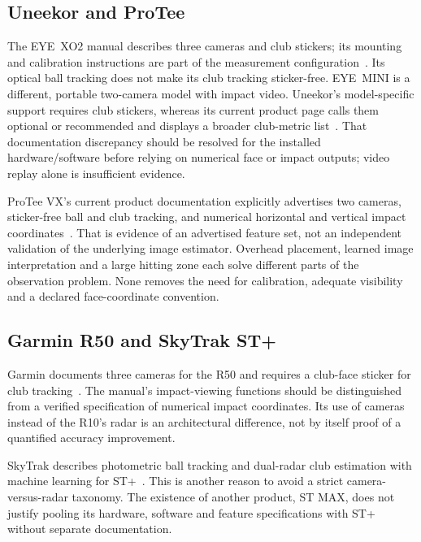 \subsection{Uneekor and ProTee}

The EYE~XO2 manual describes three cameras and club stickers; its mounting and calibration instructions are part of the measurement configuration~\cite{uneekorxo2manual}.
Its optical ball tracking does not make its club tracking sticker-free.
EYE~MINI is a different, portable two-camera model with impact video.
Uneekor's model-specific support requires club stickers, whereas its current product page calls them optional or recommended and displays a broader club-metric list~\cite{uneekorminisupport,uneekoreyexo}.
That documentation discrepancy should be resolved for the installed hardware/software before relying on numerical face or impact outputs; video replay alone is insufficient evidence.

ProTee VX's current product documentation explicitly advertises two cameras, sticker-free ball and club tracking, and numerical horizontal and vertical impact coordinates~\cite{proteevx}.
That is evidence of an advertised feature set, not an independent validation of the underlying image estimator.
Overhead placement, learned image interpretation and a large hitting zone each solve different parts of the observation problem.
None removes the need for calibration, adequate visibility and a declared face-coordinate convention.

\subsection{Garmin R50 and SkyTrak ST+}

Garmin documents three cameras for the R50 and requires a club-face sticker for club tracking~\cite{garminr50,garminr50support,garminr50stickers}.
The manual's impact-viewing functions should be distinguished from a verified specification of numerical impact coordinates.
Its use of cameras instead of the R10's radar is an architectural difference, not by itself proof of a quantified accuracy improvement.

SkyTrak describes photometric ball tracking and dual-radar club estimation with machine learning for ST+~\cite{skytrakplus}.
This is another reason to avoid a strict camera-versus-radar taxonomy.
The existence of another product, ST MAX, does not justify pooling its hardware, software and feature specifications with ST+ without separate documentation.

